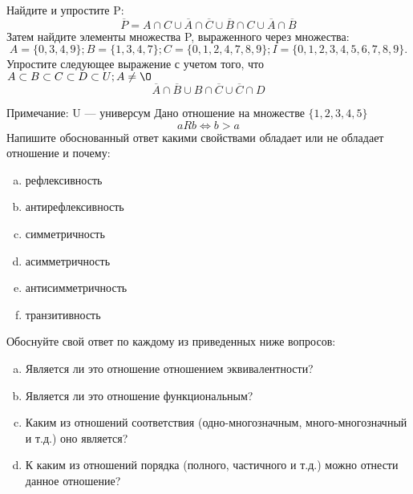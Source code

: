 \documentclass[10pt]{exam}
\begin{document}
\begin{questions}
\question
Найдите и упростите P:
\begin{equation*}
\overline{P} = A \cap C \cup \overline{A} \cap \overline{C} \cup \overline{B} \cap C \cup \overline{A} \cap \overline{B}
\end{equation*}
Затем найдите элементы множества P, выраженного через множества:
\begin{equation*}
A = \{0, 3, 4, 9\}; 
B = \{1, 3, 4, 7\};
C = \{0, 1, 2, 4, 7, 8, 9\};
I = \{0, 1, 2, 3, 4, 5, 6, 7, 8, 9\}.
\end{equation*}\question
Упростите следующее выражение с учетом того, что $A\subset B \subset C \subset D \subset U; A \neq \O$
\begin{equation*}
\overline{A} \cap \overline{B} \cup B \cap \overline{C} \cup \overline{C} \cap D
\end{equation*}

Примечание: U — универсум\question
Дано отношение на множестве $\{1, 2, 3, 4, 5\}$ 
\begin{equation*}
aRb \iff b > a
\end{equation*}
Напишите обоснованный ответ какими свойствами обладает или не обладает отношение и почему:   
\begin{enumerate} [a)]\setcounter{enumi}{0}
\item рефлексивность
\item антирефлексивность
\item симметричность
\item асимметричность
\item антисимметричность
\item транзитивность
\end{enumerate}

Обоснуйте свой ответ по каждому из приведенных ниже вопросов:
\begin{enumerate} [a)]\setcounter{enumi}{0}
    \item Является ли это отношение отношением эквивалентности?
    \item Является ли это отношение функциональным?
    \item Каким из отношений соответствия (одно-многозначным, много-многозначный и т.д.) оно является?
    \item К каким из отношений порядка (полного, частичного и т.д.) можно отнести данное отношение?
\end{enumerate}


\end{questions}
\end{document}

